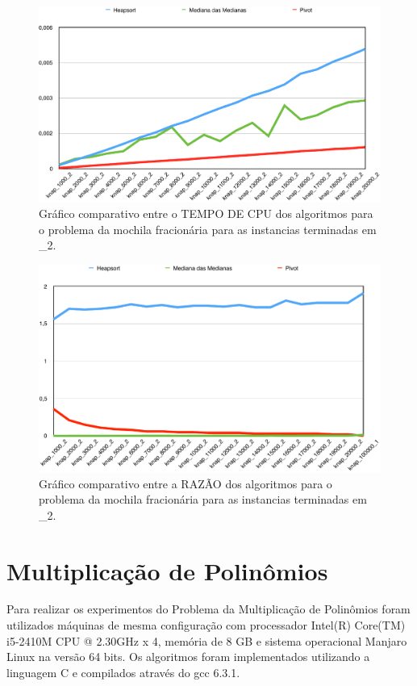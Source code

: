 \documentclass[
	12pt,				%
	oneside,			%
	a4paper,			%
	english,			%
	french,				%
	spanish,			%
	brazil,				%
	]{abntex2}
\begin{document}
\begin{figure}[H]
 \centering
 \includegraphics[width=6.4in]{charts/knap_time_2.pdf}
 \caption{Gráfico comparativo entre o TEMPO DE CPU dos algoritmos para o problema da mochila fracionária para as instancias terminadas em \_2.}
 \label{fig:AlutGraphTimeAll}
\end{figure}

\begin{figure}[H]
 \centering
 \includegraphics[width=6.4in]{charts/knap_raz_2.pdf}
 \caption{Gráfico comparativo entre a RAZÃO dos algoritmos para o problema da mochila fracionária para as instancias terminadas em \_2.}
 \label{fig:AlutGraphTimeAll}
\end{figure}


\section{Multiplicação de Polinômios}

Para realizar os experimentos do Problema da Multiplicação de Polinômios foram utilizados máquinas de mesma configuração com processador Intel(R) Core(TM) i5-2410M CPU @ 2.30GHz x 4, memória de 8 GB e sistema operacional Manjaro Linux na versão 64 bits. Os algoritmos foram implementados utilizando a linguagem C e compilados através do gcc 6.3.1.
\end{document}
